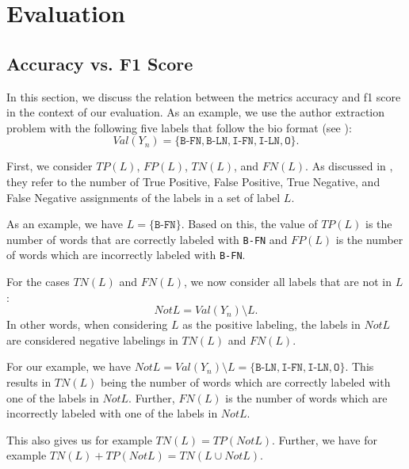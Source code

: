 \chapter{Evaluation}\label{app:cha-evaluation}
\section{Accuracy vs. F1 Score}\label{app:sec-accuracy-vs-f1-score}
In this section, we discuss the relation between the metrics \gls{accuracy} and \gls{f1 score} in the context of our evaluation.
As an example, we use the author extraction problem with the following five labels that follow the \gls{bio} format (see ):
\begin{equation*}
  \mathit{Val}(Y_n)=\{\texttt{B-FN},\texttt{B-LN},\texttt{I-FN},\texttt{I-LN},\texttt{O}\}.
\end{equation*}

First, we consider $\mathit{TP}(L)$, $\mathit{FP}(L)$, $\mathit{TN}(L)$, and $\mathit{FN}(L)$.
As discussed in , they refer to the number of True Positive, False Positive, True Negative, and False Negative assignments of the labels in a set of label $L$.

As an example, we have $L=\{\texttt{B-FN}\}$.
Based on this, the value of $\mathit{TP}(L)$ is the number of words that are correctly labeled with \texttt{B-FN} and $\mathit{FP}(L)$ is the number of words which are incorrectly labeled with \texttt{B-FN}.

For the cases $\mathit{TN}(L)$ and $\mathit{FN}(L)$, we now consider all labels that are not in $L$:
\begin{equation*}
  \mathit{NotL}=\mathit{Val}(Y_n)\setminus L.
\end{equation*}
In other words, when considering $L$ as the positive labeling, the labels in $\mathit{NotL}$ are considered negative labelings in $\mathit{TN}(L)$ and $\mathit{FN}(L)$.

For our example, we have $\mathit{NotL}=\mathit{Val}(Y_n)\setminus L=\{\texttt{B-LN},\texttt{I-FN},\texttt{I-LN},\texttt{O}\}$.
This results in $\mathit{TN}(L)$ being the number of words which are correctly labeled with one of the labels in $\mathit{NotL}$.
Further, $\mathit{FN}(L)$ is the number of words which are incorrectly labeled with one of the labels in $\mathit{NotL}$.

This also gives us for example $\mathit{TN}(L)=\mathit{TP}(\mathit{NotL})$.
Further, we have for example $\mathit{TN}(L)+\mathit{TP}(\mathit{NotL})=\mathit{TN}(L\cup\mathit{NotL})$.

